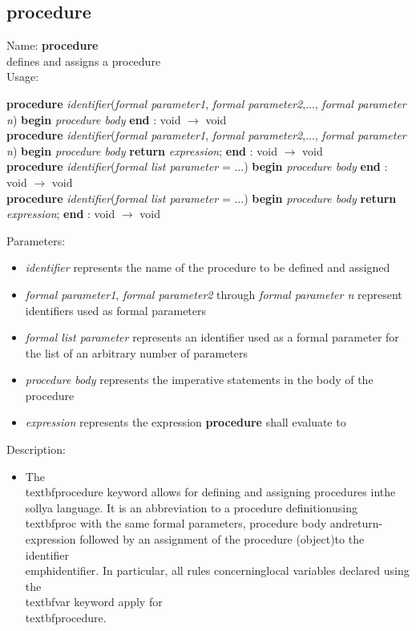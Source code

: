 \subsection{procedure}
\label{labprocedure}
\noindent Name: \textbf{procedure}\\
defines and assigns a \sollya procedure\\
\noindent Usage: 
\begin{center}
\textbf{procedure} \emph{identifier}(\emph{formal parameter1}, \emph{formal parameter2},..., \emph{formal parameter n}) \textbf{begin} \emph{procedure body} \textbf{end} : \textsf{void} $\rightarrow$ \textsf{void}\\
\textbf{procedure} \emph{identifier}(\emph{formal parameter1}, \emph{formal parameter2},..., \emph{formal parameter n}) \textbf{begin} \emph{procedure body} \textbf{return} \emph{expression}; \textbf{end} : \textsf{void} $\rightarrow$ \textsf{void}\\
\textbf{procedure} \emph{identifier}(\emph{formal list parameter} = ...) \textbf{begin} \emph{procedure body} \textbf{end} : \textsf{void} $\rightarrow$ \textsf{void}\\
\textbf{procedure} \emph{identifier}(\emph{formal list parameter} = ...) \textbf{begin} \emph{procedure body} \textbf{return} \emph{expression}; \textbf{end} : \textsf{void} $\rightarrow$ \textsf{void}\\
\end{center}
Parameters: 
\begin{itemize}
\item \emph{identifier} represents the name of the procedure to be defined and assigned
\item \emph{formal parameter1}, \emph{formal parameter2} through \emph{formal parameter n} represent identifiers used as formal parameters
\item \emph{formal list parameter} represents an identifier used as a formal parameter for the list of an arbitrary number of parameters
\item \emph{procedure body} represents the imperative statements in the body of the procedure
\item \emph{expression} represents the expression \textbf{procedure} shall evaluate to
\end{itemize}
\noindent Description: \begin{itemize}

\item The \\textbf{procedure} keyword allows for defining and assigning procedures in\n   the \\sollya language. It is an abbreviation to a procedure definition\n   using \\textbf{proc} with the same formal parameters, procedure body and\n   return-expression followed by an assignment of the procedure (object)\n   to the identifier \\emph{identifier}. In particular, all rules concerning\n   local variables declared using the \\textbf{var} keyword apply for \\textbf{procedure}.\n\end{itemize}
